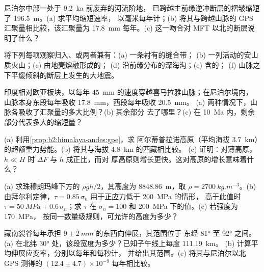 \begin{exercise}[$\star$]\label{exo:b2:himalaya-andes:3}
尼泊尔中部一处于 \qty{9.2}{ka} 前废弃的河流阶地，
已跨越主前缘逆冲断层的褶皱缩短了 \qty{196.5}{m}。(a) 求平均缩短速率，
以毫米每年计；(b) 将其与跨越山脉的 GPS 汇聚量相比较，该汇聚量为
\qty{17.8}{mm} 每年。(c) 这一吻合对 MFT 以北的断层说明了什么？
\end{exercise}

\begin{exercise}[$\star$]\label{exo:b2:himalaya-andes:4}
将下列每项观察归入、或两者兼有：(a) 一条衬有的缝合带；
(b) 一列活动的安山质火山；(c) 由地壳熔融形成的；
(d) 沿前缘分布的深海沟；(e) 含的；
(f) 山脉之下平缓倾斜的断层上发生的大地震。
\end{exercise}

\begin{exercise}[$\star\star$]\label{exo:b2:himalaya-andes:5}
印度相对欧亚板块，以每年 \qty{45}{mm} 的速度穿越喜马拉雅山脉；在尼泊尔境内，
山脉本身东段每年吸收 \qty{17.8}{mm}，西段每年吸收 \qty{20.5}{mm}。
(a) 两种情况下，山脉各吸收了汇聚量的多大比例？(b) 其余部分
去了哪里？(c) 在 \qty{10}{Ma} 内，剩余部分代表多大的缩短量？
\end{exercise}

\begin{exercise}[$\star\star$]\label{exo:b2:himalaya-andes:6}
(a) 利用\cref{prop:b2:himalaya-andes:gpe}，求
阿尔蒂普拉诺高原（平均海拔 \qty{3.7}{km}）的超额重力势能。(b) 将其与海拔 \qty{4.8}{km} 的西藏相比较。
(c) 证明：对薄高原，$h \ll H$ 时 $\Delta F$ 与 $h$ 成正比，而对
厚高原则增长更快。这对高原的增长意味着什么？
\end{exercise}

\begin{exercise}[$\star\star$]\label{exo:b2:himalaya-andes:7}
(a) 求珠穆朗玛峰下方的 $\rho g h/2$，其高度为 \qty{8848.86}{m}，取 $\rho =
\qty{2700}{kg.m^{-3}}$。(b) 由拜尔利定律，$\tau = 0.85\,\sigma_n$ 用于正应力低于 \qty{200}{MPa} 的情形，
高于此值时 $\tau = \qty{50}{MPa} + 0.6\,\sigma_n$；求 $\tau$ 在 $\sigma_n =
100$ 和 \qty{200}{MPa} 下的值。(c) 若强度为 \qty{170}{MPa}，
按同一数量级规则，可允许的高度为多少？
\end{exercise}

\begin{exercise}[$\star\star$]\label{exo:b2:himalaya-andes:8}
藏南裂谷每年承担 $9 \pm \qty{2}{mm}$ 的东西向伸展，其范围位于
东经 \ang{81} 至 \ang{92} 之间。(a) 在北纬 \ang{30} 处，该段宽度为多少？已知子午线上每度 \qty{111.19}{km}。
(b) 计算平均伸展应变率，分别以每年和每秒计，
并给出其范围。(c) 将其与尼泊尔以北 GPS 测得的 $(12.4 \pm 4.7) \times 10^{-9}$ 每年相比较。
\end{exercise}


